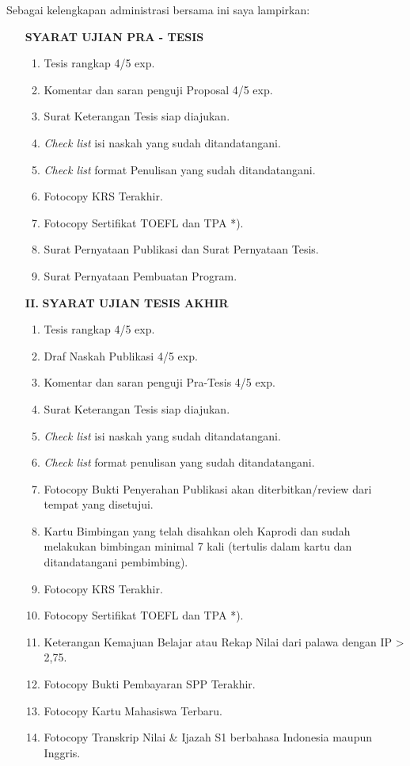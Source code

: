 \noindent
Sebagai kelengkapan administrasi bersama ini saya lampirkan:
\begin{enumerate}
	\item[\textbf{\circled{I.}}] \textbf{SYARAT UJIAN PRA - TESIS}
	\begin{enumerate}
		\setlength\itemsep{0.1mm}
		\item Tesis rangkap 4/5 exp.
		\item Komentar dan saran penguji Proposal 4/5 exp.
		\item Surat Keterangan Tesis siap diajukan.
		\item \textit{Check list} isi naskah yang sudah ditandatangani.
		\item \textit{Check list} format Penulisan yang sudah ditandatangani.
		\item Fotocopy KRS Terakhir.
		\item Fotocopy Sertifikat TOEFL dan TPA *).
		\item Surat Pernyataan Publikasi dan Surat Pernyataan Tesis.
		\item Surat Pernyataan Pembuatan Program.
	\end{enumerate}
	\item[\textbf{II.}] \textbf{SYARAT UJIAN TESIS AKHIR}
	\begin{enumerate}
		\setlength\itemsep{0.1mm}
		\item Tesis rangkap 4/5 exp.
		\item Draf Naskah Publikasi 4/5 exp.
		\item Komentar dan saran penguji Pra-Tesis 4/5 exp.
		\item Surat Keterangan Tesis siap diajukan.
		\item \textit{Check list} isi naskah yang sudah ditandatangani.
		\item \textit{Check list} format penulisan yang sudah ditandatangani.
		\item Fotocopy Bukti Penyerahan Publikasi akan diterbitkan/review dari tempat yang disetujui.
		\item Kartu Bimbingan yang telah disahkan oleh Kaprodi dan sudah melakukan bimbingan minimal 7 kali (tertulis dalam kartu dan ditandatangani pembimbing).
		\item Fotocopy KRS Terakhir.
		\item Fotocopy Sertifikat TOEFL dan TPA *).
		\item Keterangan Kemajuan Belajar atau Rekap Nilai dari palawa dengan  IP > 2,75.
		\item Fotocopy Bukti Pembayaran SPP Terakhir.
		\item Fotocopy Kartu Mahasiswa Terbaru.
		\item Fotocopy Transkrip Nilai \& Ijazah S1 berbahasa Indonesia maupun Inggris.
	\end{enumerate}
\end{enumerate}

